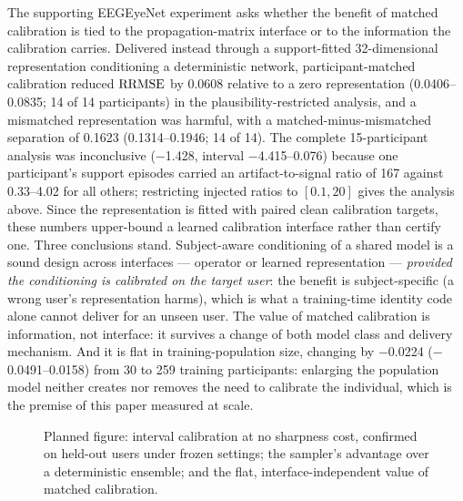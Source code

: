 The supporting EEGEyeNet experiment asks whether the benefit of matched calibration is tied to the propagation-matrix interface or to the information the calibration carries. Delivered instead through a support-fitted 32-dimensional representation conditioning a deterministic network, participant-matched calibration reduced $\mathrm{RRMSE}$ by 0.0608 relative to a zero representation (0.0406--0.0835; 14 of 14 participants) in the plausibility-restricted analysis, and a mismatched representation was harmful, with a matched-minus-mismatched separation of 0.1623 (0.1314--0.1946; 14 of 14). The complete 15-participant analysis was inconclusive ($-$1.428, interval $-$4.415--0.076) because one participant's support episodes carried an artifact-to-signal ratio of 167 against 0.33--4.02 for all others; restricting injected ratios to $[0.1,20]$ gives the analysis above. Since the representation is fitted with paired clean calibration targets, these numbers upper-bound a learned calibration interface rather than certify one. Three conclusions stand. Subject-aware conditioning of a shared model is a sound design across interfaces --- operator or learned representation --- \emph{provided the conditioning is calibrated on the target user}: the benefit is subject-specific (a wrong user's representation harms), which is what a training-time identity code alone cannot deliver for an unseen user. The value of matched calibration is information, not interface: it survives a change of both model class and delivery mechanism. And it is flat in training-population size, changing by $-$0.0224 ($-$0.0491--0.0158) from 30 to 259 training participants: enlarging the population model neither creates nor removes the need to calibrate the individual, which is the premise of this paper measured at scale.

\begin{figure}[t]
  \centering
  \caption{Planned figure: interval calibration at no sharpness cost, confirmed on held-out users under frozen settings; the sampler's advantage over a deterministic ensemble; and the flat, interface-independent value of matched calibration.}
  \label{fig:uq}
\end{figure}

